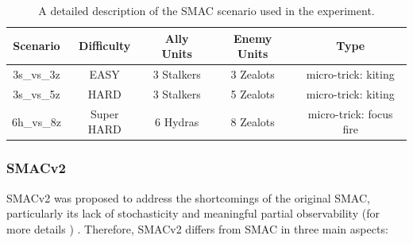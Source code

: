 \begin{table}[H]
\centering

\renewcommand{\arraystretch}{1.6} 

\begin{tabular}{ccccc}
\hline
\textbf{Scenario} & \textbf{Difficulty} & \textbf{Ally Units} & \textbf{Enemy Units} & \textbf{Type} \\
\hline
3s\_vs\_3z & EASY & 3 Stalkers & 3 Zealots & micro-trick: kiting \\
\hline
3s\_vs\_5z & HARD & 3 Stalkers & 5 Zealots & micro-trick: kiting \\
\hline
6h\_vs\_8z & Super HARD & 6 Hydras & 8 Zealots & micro-trick: focus fire \\
\hline
\end{tabular}
\caption{A detailed description of the SMAC scenario used in the experiment.}
\label{tab:smac_scenarios}
\end{table}
\subsubsection{SMACv2}

SMACv2 \parencite{smacv2}  was proposed to address the shortcomings of the original SMAC, particularly its lack of stochasticity and meaningful partial observability (for more details \parencite{smacv2_review}) . Therefore, SMACv2 differs from SMAC in three main aspects:

